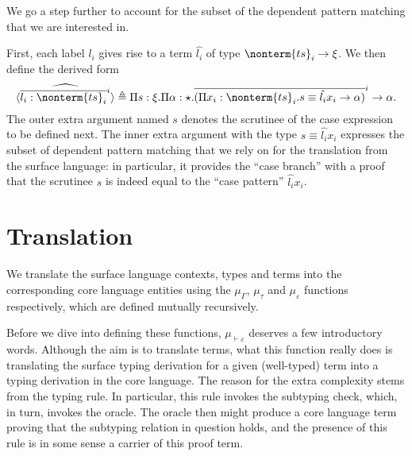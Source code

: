 \documentclass[a4paper]{article}
\begin{document}
\begin{itemize}
    We go a step further to account for the subset of the dependent pattern matching
    that we are interested in.

    First, each label $l_i$ gives rise to a term $\hat{l_i}$ of type $\nonterm{ts}_i \rightarrow \xi$.
    We then define the derived form
    \[
      \widehat{\langle \overline{l_i : \nonterm{ts}_i}^i \rangle}
        \triangleq
          \Pi s : \xi.
          \Pi \alpha : \star.
          \overline{(\Pi x_i : \nonterm{ts}_i. s \equiv \hat{l_i} x_i \rightarrow \alpha)}^i \rightarrow \alpha.
    \]
    The outer extra argument named $s$ denotes the scrutinee of the case expression to be defined next.
    The inner extra argument with the type $s \equiv \hat{l_i} x_i$
    expresses the subset of dependent pattern matching
    that we rely on for the translation from the surface language:
    in particular, it provides the ``case branch'' with a proof
    that the scrutinee $s$ is indeed equal to the ``case pattern'' $\hat{l_i} x_i$.
\end{itemize}

\section{Translation}

\newcommand{\tranctx}{\mu_\Gamma}
\newcommand{\tranty}{\mu_\tau}
\newcommand{\tranterm}{\mu_\varepsilon}

\newcommand{\Tranctx}{\mu_{\vdash\Gamma}}
\newcommand{\Tranty}{\mu_{\vdash\tau}}
\newcommand{\Tranterm}{\mu_{\vdash\varepsilon}}

We translate the surface language contexts, types and terms into the corresponding core language entities
using the $\tranctx$, $\tranty$ and $\tranterm$ functions respectively,
which are defined mutually recursively.

Before we dive into defining these functions, $\Tranterm$ deserves a few introductory words.
Although the aim is to translate terms,
what this function really does is translating the surface typing derivation for a given (well-typed) term
into a typing derivation in the core language.
The reason for the extra complexity stems from the  typing rule.
In particular, this rule invokes the subtyping check, which, in turn, invokes the oracle.
The oracle then might produce a core language term proving that the subtyping relation in question holds,
and the presence of this rule is in some sense a carrier of this proof term.
\end{document}
